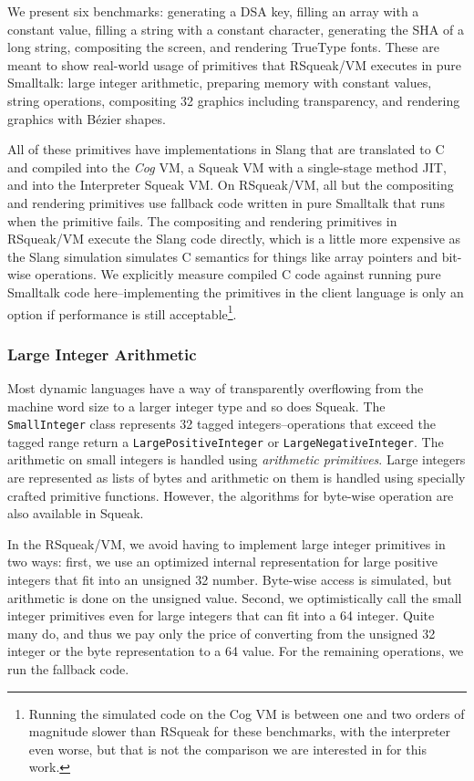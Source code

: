 \documentclass[
10pt,          %
]{sigplanconf}
\begin{document}
We present six benchmarks: generating a \acs{DSA} key, filling an
array with a constant value, filling a string with a constant
character, generating the \acs{SHA} of a long string, compositing the
screen, and rendering TrueType fonts. These are meant to show
real-world usage of primitives that RSqueak/VM executes in pure
Smalltalk: large integer arithmetic, preparing memory with constant
values, string operations, compositing \SI{32}{\bit} graphics
including transparency, and rendering graphics with Bézier shapes.

All of these primitives have implementations in Slang that are
translated to C and compiled into the \emph{Cog} \ac{VM}, a Squeak
\ac{VM} with a single-stage method \ac{JIT}, and into the Interpreter
Squeak \gls{VM}. On RSqueak/VM, all but the compositing and rendering
primitives use fallback code written in pure Smalltalk that runs when
the primitive fails. The compositing and rendering primitives in
RSqueak/VM execute the Slang code directly, which is a little more
expensive as the Slang simulation simulates C semantics for things
like array pointers and bit-wise operations. We explicitly measure
compiled C code against running pure Smalltalk code
here\---implementing the primitives in the client language is only an
option if performance is still acceptable\footnote{Running the
  simulated code on the Cog VM is between one and two orders of
  magnitude slower than RSqueak for these benchmarks, with the
  interpreter even worse, but that is not the comparison we are
  interested in for this work.}.

\subsubsection{Large Integer Arithmetic}
\label{sec:large-integ-arithm}
Most dynamic languages have a way of transparently overflowing from the machine
word size to a larger integer type and so does Squeak. The \verb!SmallInteger!
class represents \SI{32}{\bit} tagged integers\---operations that exceed the tagged
range return a \verb!LargePositiveInteger! or \verb!LargeNegativeInteger!. The
arithmetic on small integers is handled using \emph{arithmetic primitives}.
Large integers are represented as lists of bytes and arithmetic on them is
handled using specially crafted primitive functions. However, the algorithms
for byte-wise operation are also available in Squeak.

In the RSqueak/VM, we avoid having to implement large integer primitives in two
ways: first, we use an optimized internal representation for large positive
integers that fit into an unsigned \SI{32}{\bit} number. Byte-wise access is
simulated, but arithmetic is done on the unsigned value. Second, we
optimistically call the small integer primitives even for large integers that
can fit into a \SI{64}{\bit} integer. Quite many do, and thus we pay only the
price of converting from the unsigned \SI{32}{\bit} integer or the byte
representation to a \SI{64}{\bit} value. For the remaining operations, we run
the fallback code.
\end{document}
